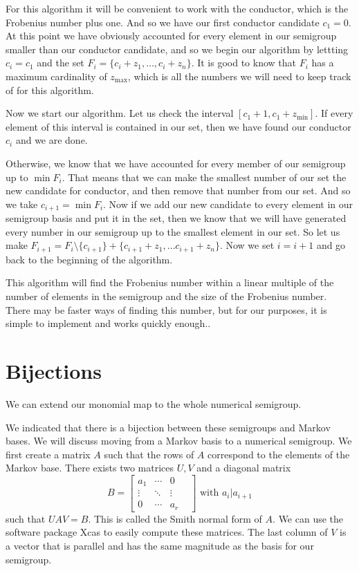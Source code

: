 \documentclass[11pt]{amsart}
\theoremstyle{plain}
\theoremstyle{definition}
\begin{document}
For this algorithm it will be convenient to work with the conductor, which is the Frobenius number plus one.
And so we have our first conductor candidate $c_1=0$.
At this point we have obviously accounted for every element in our semigroup smaller than our conductor candidate, and so we begin our algorithm by lettting $c_i=c_1$ and the set $F_i=\{c_i+z_1,\dots,c_i+z_n\}$.
It is good to know that $F_i$ has a maximum cardinality of $z_\text{max}$, which is all the numbers we will need to keep track of for this algorithm.

Now we start our algorithm.
Let us check the interval $[c_1+1,c_1+z_\text{min}]$.
If every element of this interval is contained in our set, then we have found our conductor $c_i$ and we are done.

Otherwise, we know that we have accounted for every member of our semigroup up to $\min F_i$. That means that we can make the smallest number of our set the new candidate for conductor, and then remove that number from our set. And so we take $c_{i+1}=\min F_i$. Now if we add our new candidate to every element in our semigroup basis and put it in the set, then we know that we will have generated every number in our semigroup up to the smallest element in our set. So let us make $F_{i+1}=F_i\setminus \{c_{i+1}\} + \{c_{i+1}+z_1,\dots c_{i+1}+z_n\}$. Now we set $i=i+1$ and go back to the beginning of the algorithm.

This algorithm will find the Frobenius number within a linear multiple of the number of elements in the semigroup and the size of the Frobenius number. There may be faster ways of finding this number, but for our purposes, it is simple to implement and works quickly enough.\cite{frobmask}.

\section{Bijections}
We can extend our monomial map to the whole numerical semigroup.

We indicated that there is a bijection between these semigroups and Markov
bases. We will discuss moving from a Markov basis to a numerical semigroup. We
first create a matrix $A$ such that the rows of $A$ correspond to the elements
of the Markov base. There exists two matrices $U,V$ and a diagonal matrix
\[B=
\left[\begin{array}{cccc}
  a_1&\cdots&0\\
  \vdots&\ddots&\vdots \\
  0&\cdots&a_r&
\end{array}\right]
\text{ with }a_i|a_{i+1}\]
such that $UAV=B$. This is called the Smith normal form of $A$\cite{adkins}.
We can use the software package Xcas\cite{xcas} to easily compute these matrices. The last
column of $V$ is a vector that is parallel and has the same magnitude as the
basis for our semigroup.
\end{document}
